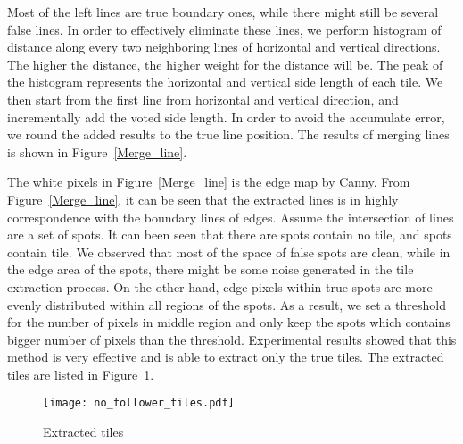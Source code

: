 \begin{enumerate}
Most of the left lines are true boundary ones, while there might still be
several false lines. In order to effectively eliminate these lines, we perform
histogram of distance along every two neighboring lines of horizontal and
vertical directions. The higher the distance, the higher weight for the distance
will be. The peak of the histogram represents the horizontal and vertical side
length of each tile. We then start from the first line from horizontal and
vertical direction, and incrementally add the voted side length. In order to
avoid the accumulate error, we round the added results to the true line
position. The results of merging lines is shown in Figure~\ref{Merge_line}.

\end{enumerate} 

The white pixels in Figure~\ref{Merge_line} is the edge map by Canny. From
Figure~\ref{Merge_line}, it can be seen that the extracted lines is in highly
correspondence with the boundary lines of edges. Assume the intersection of lines
are a set of spots. It can been seen that there are spots contain no tile, and
spots contain tile. We observed that most of the space of false spots are clean,
while in the edge area of the spots, there might be some noise generated in the
tile extraction process. On the other hand, edge pixels within true spots are
more evenly distributed within all regions of the spots. As a result, we set a
threshold for the number of pixels in middle region and only keep the spots which
contains bigger number of pixels than the threshold. Experimental results showed
that this method is very effective and is able to extract only the true tiles.
The extracted tiles are listed in Figure~\ref{ex_tiles}.


\begin{figure}[htbp]
\centering
\texttt{[image: no\_follower\_tiles.pdf]} 
\caption{Extracted tiles}
\label{ex_tiles}
\end{figure}